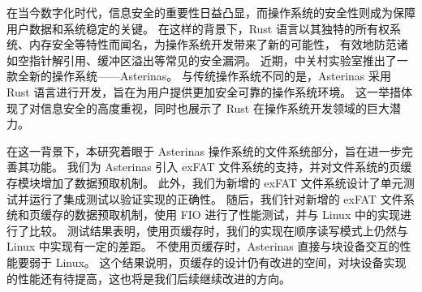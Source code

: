 
\begin{cabstract}
	在当今数字化时代，信息安全的重要性日益凸显，而操作系统的安全性则成为保障用户数据和系统稳定的关键。
	在这样的背景下，Rust 语言以其独特的所有权系统、内存安全等特性而闻名，为操作系统开发带来了新的可能性，
	有效地防范诸如空指针解引用、缓冲区溢出等常见的安全漏洞。
	近期，中关村实验室推出了一款全新的操作系统——Asterinas。
	与传统操作系统不同的是，Asterinas 采用 Rust 语言进行开发，旨在为用户提供更加安全可靠的操作系统环境。
	这一举措体现了对信息安全的高度重视，同时也展示了 Rust 在操作系统开发领域的巨大潜力。
	
	在这一背景下，本研究着眼于 Asterinas 操作系统的文件系统部分，旨在进一步完善其功能。
	我们为 Asterinas 引入 exFAT 文件系统的支持，并对文件系统的页缓存模块增加了数据预取机制。
	此外，我们为新增的 exFAT 文件系统设计了单元测试并运行了集成测试以验证实现的正确性。
	随后，我们针对新增的 exFAT 文件系统和页缓存的数据预取机制，使用 FIO 进行了性能测试，并与 Linux 中的实现进行了比较。
	测试结果表明，使用页缓存时，我们的实现在顺序读写模式上仍然与 Linux 中实现有一定的差距。
	不使用页缓存时，Asterinas 直接与块设备交互的性能要弱于 Linux。
	这个结果说明，页缓存的设计仍有改进的空间，对块设备实现的性能还有待提高，这也将是我们后续继续改进的方向。
	

\end{cabstract}

